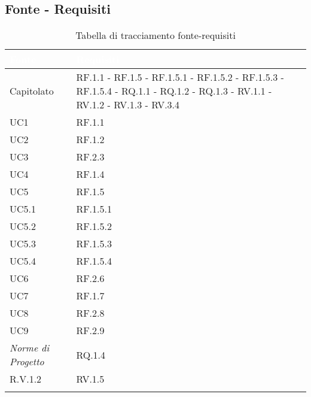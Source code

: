 \subsection{Fonte - Requisiti}
\begin{center}
  \centering
  \begin{longtable}{|C{6cm}|C{6cm}|}
    \hline
    \textcolor[HTML]{FFFFFF}{\textbf{Fonte}} & \textcolor[HTML]{FFFFFF}{\textbf{Requisiti}} \\ \hline
    Capitolato & RF.1.1 - RF.1.5 - RF.1.5.1 - RF.1.5.2 - RF.1.5.3 - RF.1.5.4 - RQ.1.1 - RQ.1.2 - RQ.1.3 - RV.1.1 - RV.1.2 - RV.1.3 - RV.3.4 \\ \hline
    UC1 & RF.1.1 \\ \hline
    UC2 & RF.1.2 \\ \hline
    UC3 & RF.2.3 \\ \hline
    UC4 & RF.1.4 \\ \hline
    UC5 & RF.1.5 \\ \hline
    UC5.1 & RF.1.5.1 \\ \hline
    UC5.2 & RF.1.5.2 \\ \hline
    UC5.3 & RF.1.5.3 \\ \hline
    UC5.4 & RF.1.5.4 \\ \hline
    UC6 & RF.2.6 \\ \hline
    UC7 & RF.1.7 \\ \hline
    UC8 & RF.2.8 \\ \hline
    UC9 & RF.2.9 \\ \hline
    \textit{Norme di Progetto} & RQ.1.4 \\ \hline
    R.V.1.2 & RV.1.5 \\ \hline

    \caption{Tabella di tracciamento fonte-requisiti}
  \end{longtable}
\end{center}


